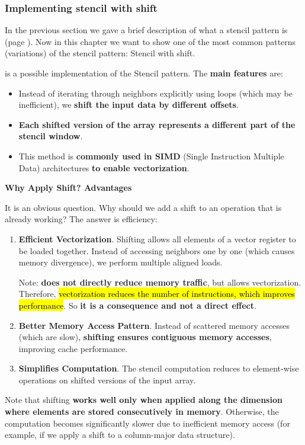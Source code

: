 \subsubsection{Implementing stencil with shift}

In the previous section we gave a brief description of what a stencil pattern is (page \pageref{subsection: Stencil Pattern}). Now in this chapter we want to show one of the most common patterns (variations) of the stencil pattern: Stencil with shift.

\highspace
{} is a possible implementation of the Stencil pattern. The \textbf{main features} are:
\begin{itemize}
    \item Instead of iterating through neighbors explicitly using loops (which may be inefficient), we \textbf{shift the input data by different offsets}.
    \item \textbf{Each shifted version of the array represents a different part of the stencil window}.
    \item This method is \textbf{commonly used in SIMD} (Single Instruction Multiple Data) architectures \textbf{to enable vectorization}.
\end{itemize}

\highspace
\begin{flushleft}
    \textcolor{Green3}{ \textbf{Why Apply Shift? Advantages}}
\end{flushleft}
It is an obvious question. Why should we add a shift to an operation that is already working? The answer is efficiency:
\begin{enumerate}[label=\textcolor{Green3}{\faIcon{check}}]
    \item \textcolor{Green3}{\textbf{Efficient Vectorization}}. Shifting allows all elements of a vector register to be loaded together. Instead of accessing neighbors one by one (which causes memory divergence), we perform multiple aligned loads.

    Note: \textbf{does not directly reduce memory traffic}, but allows vectorization. Therefore, \hl{vectorization reduces the number of instructions, which improves performance}. So \textbf{it is a consequence and not a direct effect}.


    \item \textcolor{Green3}{\textbf{Better Memory Access Pattern}}. Instead of scattered memory accesses (which are slow), \textbf{shifting ensures contiguous memory accesses}, improving cache performance.
    
    
    \item \textcolor{Green3}{\textbf{Simplifies Computation}}. The stencil computation reduces to element-wise operations on shifted versions of the input array.
\end{enumerate}
Note that shifting \textbf{works well only when applied along the dimension where elements are stored consecutively in memory}. Otherwise, the computation becomes significantly slower due to inefficient memory access (for example, if we apply a shift to a column-major data structure).

